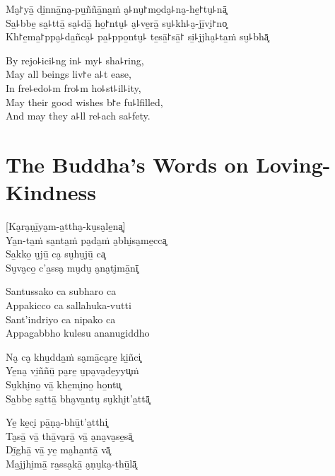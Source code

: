 Ma̮꜓yā̱ di̱nnā̱na̮-pu̱ññā̱na̱ṁ a̮꜕nu̮꜓mo̱da̮꜕na̮-he̱꜓tu̮꜕nā͓\\
Sa̱꜕bbe̱ sa̱꜕ttā̱ sa̮꜕dā̱ ho̱꜓ntu̮꜕ a̮꜕ve̱rā̱ su̮꜕kh꜕a̮-jī̱vi̮꜓no͓\\
Kh꜓e̱ma̱꜓ppa̮꜕da̱ñca̮꜕ pa̱꜕ppo̱ntu̮꜕ te̱sā̱꜓sā̱꜓ si̱꜕jjha̮꜕ta̱ṁ su̮꜕bhā͓

\begin{english}
  By rejo꜕ici꜕ng in꜕ my꜕ sha꜕ring,\\
  May all beings liv꜓e a꜕t ease,\\
  In fre꜕edo꜕m fro꜕m ho꜕st꜕il꜕ity,\\
  May their good wishes b꜓e fu꜕lfilled,\\
  And may they a꜕ll re꜕ach sa꜕fety.
\end{english}

\chapter*[Loving-Kindness]{The Buddha's Words on Loving-Kindness}


\delegateSetUseNext

\begin{leader}
\end{leader}

[Ka̮ra̮ṇī̱ya̮m-a̱ttha̮-ku̮sa̮le̱na͓]\\
Ya̱n-ta̱ṁ sa̱nta̱ṁ pa̮da̱ṁ a̮bhi̮sa̮me̱cca͓\\
Sa̱kko̱ u̮jū̱ ca̮ su̮hu̮jū̱ ca͓\\
Su̮va̮co̱ c'a̱ssa̮ mu̮du̮ a̮na̮ti̮mā̱nī͓

Santussako ca subharo ca\\
Appakicco ca sallahuka-vutti\\
Sant'indriyo ca nipako ca\\
Appagabbho kulesu ananugiddho

Na̮ ca̮ khu̱dda̱ṁ sa̮mā̱ca̮re̱ ki̱ñci͓\\
Ye̱na̮ vi̱ññū̱ pa̮re̱ u̮pa̮va̮de̱yyu͓ṁ\\
Su̮khi̮no̱ vā̱ khe̱mi̮no̱ ho̱ntu͓\\
Sa̱bbe̱ sa̱ttā̱ bha̮va̱ntu̮ su̮khi̮t'a̱ttā͓

Ye̱ ke̱ci̮ pā̱ṇa̮-bhū̱t'a̱tthi͓\\
Ta̮sā̱ vā̱ thā̱va̮rā̱ vā̱ a̮na̮va̮se̱sā͓\\
Dī̱ghā̱ vā̱ ye̱ ma̮ha̱ntā̱ vā͓\\
Ma̱jjhi̮mā̱ ra̱ssa̮kā̱ a̮ṇu̮ka̮-thū̱lā͓


